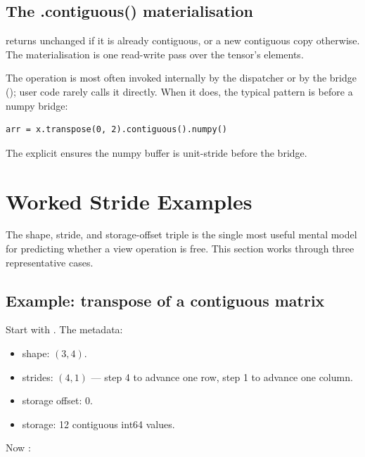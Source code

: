\subsection{The .contiguous() materialisation}
\label{ssec:shape_view:contiguous_op}

 returns  unchanged if it is already
contiguous, or a new contiguous copy otherwise. The materialisation
is one read-write pass over the tensor's elements.

The operation is most often invoked internally by the dispatcher
or by the  bridge
(); user code rarely calls it directly.
When it does, the typical pattern is before a numpy bridge:

\begin{lstlisting}[style=lucid,language=LucidPython]
arr = x.transpose(0, 2).contiguous().numpy()
\end{lstlisting}

The explicit  ensures the numpy buffer is
unit-stride before the bridge.

\section{Worked Stride Examples}
\label{sec:shape_view:stride_examples}

The shape, stride, and storage-offset triple is the single most
useful mental model for predicting whether a view operation is
free. This section works through three representative cases.

\subsection{Example: transpose of a contiguous matrix}
\label{ssec:shape_view:transpose_example}

Start with . The metadata:

\begin{itemize}
  \item shape: $(3, 4)$.
  \item strides: $(4, 1)$ --- step 4 to advance one row, step 1 to
    advance one column.
  \item storage offset: 0.
  \item storage: 12 contiguous int64 values.
\end{itemize}

Now :

